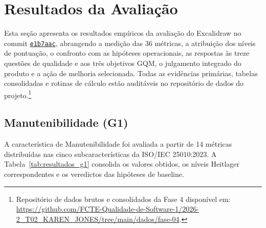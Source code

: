 \documentclass[12pt]{article}
\newcommand{\commitref}{\href{https://github.com/excalidraw/excalidraw/commit/e1b7aacb356a492aa1e0fc6eb57b8896124027f0}{\texttt{e1b7aac}}}
\begin{document}
\section{Resultados da Avaliação}
\label{sec:resultados}

Esta seção apresenta os resultados empíricos da avaliação do Excalidraw no commit \commitref, abrangendo a medição das 36 métricas, a atribuição dos níveis de pontuação, o confronto com as hipóteses operacionais, as respostas às treze questões de qualidade e aos três objetivos GQM, o julgamento integrado do produto e a ação de melhoria selecionada. Todas as evidências primárias, tabelas consolidadas e rotinas de cálculo estão auditáveis no repositório de dados do projeto.\footnote{Repositório de dados brutos e consolidados da Fase 4 disponível em: \url{https://github.com/FCTE-Qualidade-de-Software-1/2026-2_T02_KAREN_JONES/tree/main/dados/fase-04}.}

\subsection{Manutenibilidade (G1)}
\label{subsec:resultados-g1}

A característica de Manutenibilidade foi avaliada a partir de 14 métricas distribuídas nas cinco subcaracterísticas da ISO/IEC 25010:2023. A Tabela~\ref{tab:resultados_g1} consolida os valores obtidos, os níveis Heitlager correspondentes e os veredictos das hipóteses de baseline.
\end{document}
